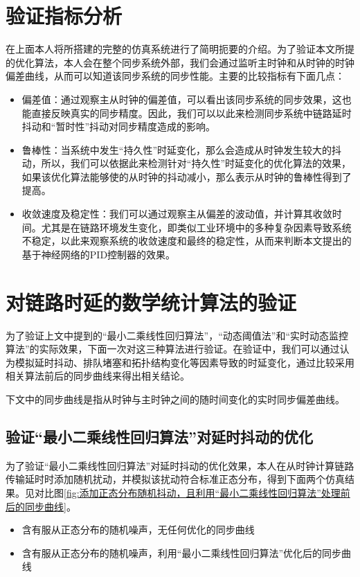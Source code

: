 \section{验证指标分析}
在上面本人将所搭建的完整的仿真系统进行了简明扼要的介绍。为了验证本文所提的优化算法，本人会在整个同步系统外部，我们会通过监听主时钟和从时钟的时钟偏差曲线，从而可以知道该同步系统的同步性能。主要的比较指标有下面几点：
\begin{itemize}[noitemsep,topsep=0pt,parsep=0pt,partopsep=0pt]
	\item 偏差值：通过观察主从时钟的偏差值，可以看出该同步系统的同步效果，这也能直接反映真实的同步精度。因此，我们可以以此来检测同步系统中链路延时抖动和“暂时性”抖动对同步精度造成的影响。
	\item 鲁棒性：当系统中发生“持久性”时延变化，那么会造成从时钟发生较大的抖动，所以，我们可以依据此来检测针对“持久性”时延变化的优化算法的效果，如果该优化算法能够使的从时钟的抖动减小，那么表示从时钟的鲁棒性得到了提高。
	\item 收敛速度及稳定性：我们可以通过观察主从偏差的波动值，并计算其收敛时间。尤其是在链路环境发生变化，即类似工业环境中的多种复杂因素导致系统不稳定，以此来观察系统的收敛速度和最终的稳定性，从而来判断本文提出的基于神经网络的PID控制器的效果。
\end{itemize}

\section{对链路时延的数学统计算法的验证}
为了验证上文中提到的“最小二乘线性回归算法”，“动态阈值法”和“实时动态监控算法”的实际效果，下面一次对这三种算法进行验证。在验证中，我们可以通过认为模拟延时抖动、排队堵塞和拓扑结构变化等因素导致的时延变化，通过比较采用相关算法前后的同步曲线来得出相关结论。

下文中的同步曲线是指从时钟与主时钟之间的随时间变化的实时同步偏差曲线。

\subsection{验证“最小二乘线性回归算法”对延时抖动的优化}
为了验证“最小二乘线性回归算法”对延时抖动的优化效果，本人在从时钟计算链路传输延时时添加随机扰动，并模拟该扰动符合标准正态分布，得到下面两个仿真结果。见对比图\ref{fig:添加正态分布随机抖动，且利用“最小二乘线性回归算法”处理前后的同步曲线}。
\begin{itemize}[noitemsep,topsep=0pt,parsep=0pt,partopsep=0pt]
  \item 含有服从正态分布的随机噪声，无任何优化的同步曲线
  \item 含有服从正态分布的随机噪声，利用“最小二乘线性回归算法”优化后的同步曲线
\end{itemize}

